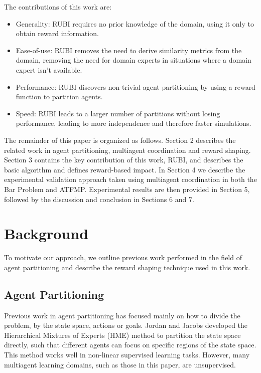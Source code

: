 \documentclass[letterpaper]{article}
\begin{document}
The contributions of this work are:
\begin{itemize} 
\item Generality: RUBI requires no prior knowledge of the domain, using it only to obtain reward information.
\item Ease-of-use: RUBI removes the need to derive similarity metrics from the domain, removing the need for domain experts in situations where a domain expert isn't available.
\item Performance: RUBI discovers non-trivial agent partitioning by using a reward function to partition agents.
\item Speed: RUBI leads to a larger number of partitions without losing performance, leading to more independence and therefore faster simulations.
\end{itemize} 
 
The remainder of this paper is organized as follows. Section 2 describes the related work in agent partitioning, multiagent coordination and reward shaping. Section 3 contains the key contribution of this work, RUBI, and describes the basic algorithm and defines reward-based impact. In Section 4 we describe the experimental validation approach taken using multiagent coordination in both the Bar Problem and ATFMP. Experimental results are then provided in Section 5, followed by the discussion and conclusion in Sections 6 and 7.

\section{Background}
\label{sec:BACKGROUND}

To motivate our approach, we outline previous work performed in the field of agent partitioning and describe the reward shaping technique used in this work.

\subsection{Agent Partitioning}
Previous work in agent partitioning has focused mainly on how to divide the problem, by the state space, actions or goals. Jordan and Jacobs  developed the Hierarchical Mixtures of Experts (HME) method to partition the state space directly, such that different agents can focus on specific regions of the state space. This method works well in non-linear supervised learning tasks. However, many multiagent learning domains, such as those in this paper, are unsupervised.
\end{document}
